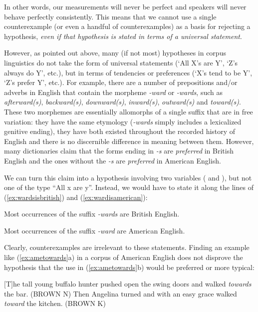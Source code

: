 In other words, our measurements will never be perfect and speakers will never behave perfectly consistently. This means that we cannot use a single counterexample (or even a handful of counterexamples) as a basis for rejecting a hypothesis, \emph{even if that hypothesis is stated in terms of a universal statement}.

However, as pointed out above, many (if not most) hypotheses in corpus linguistics do not take the form of universal statements (`All X's are Y', `Z's always do Y', etc.), but in terms of tendencies or preferences (`X's tend to be Y', `Z's prefer Y', etc.). For example, there are a number of prepositions and/or adverbs in English that contain the morpheme \textit{-ward} or \textit{-wards}, such as \textit{afterward(s)}, \textit{backward(s)}, \textit{downward(s)}, \textit{inward(s)}, \textit{outward(s)} and \textit{toward(s)}. These two morphemes are essentially allomorphs of a single suffix that are in free variation: they have the same etymology (\textit{-wards} simply includes a lexicalized genitive ending), they have both existed throughout the recorded history of English and there is no discernible difference in meaning between them. However, many dictionaries claim that the forms ending in \textit{-s} are \emph{preferred} in British English and the ones without the \textit{-s} are \emph{preferred} in American English.

We can turn this claim into a hypothesis involving two variables ( and ), but not one of the type ``All x are y''. Instead, we would have to state it along the lines of (\ref{ex:wardsisbritish}) and (\ref{ex:wardisamerican}):

\begin{exe}
\ex Most occurrences of the suffix \textit{-wards} are British English.\label{ex:wardsisbritish}
\end{exe}

\begin{exe}
\ex Most occurrences of the suffix \textit{-ward} are American English.\label{ex:wardisamerican}
\end{exe}

Clearly, counterexamples are irrelevant to these statements. Finding an example like (\ref{ex:ametowards}a) in a corpus of American English does not disprove the hypothesis that the use in (\ref{ex:ametowards}b) would be preferred or more typical:

\begin{exe}
\ex
\begin{xlist} 
\label{ex:ametowards}
\ex $[$T$]$he tall young buffalo hunter pushed open the swing doors and walked \textit{towards} the bar. (BROWN N)
\ex Then Angelina turned and with an easy grace walked \textit{toward} the kitchen. (BROWN K)
\end{xlist}
\end{exe}

